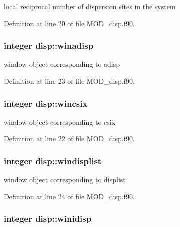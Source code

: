 local reciprocal number of dispersion sites in the system 



Definition at line 20 of file M\-O\-D\-\_\-disp.\-f90.

\hypertarget{classdisp_a496a52cc2d07a7b14d8febbd3975567b}{
\subsubsection[{winadisp}]{\setlength{\rightskip}{0pt plus 5cm}integer disp\-::winadisp}}\label{classdisp_a496a52cc2d07a7b14d8febbd3975567b}


window object corresponding to adisp 



Definition at line 23 of file M\-O\-D\-\_\-disp.\-f90.

\hypertarget{classdisp_aa37195cc4b48e320220322d2ce2cf5e5}{
\subsubsection[{wincsix}]{\setlength{\rightskip}{0pt plus 5cm}integer disp\-::wincsix}}\label{classdisp_aa37195cc4b48e320220322d2ce2cf5e5}


window object corresponding to csix 



Definition at line 22 of file M\-O\-D\-\_\-disp.\-f90.

\hypertarget{classdisp_a020abc5d4a3b714acb851b69b931668e}{
\subsubsection[{windisplist}]{\setlength{\rightskip}{0pt plus 5cm}integer disp\-::windisplist}}\label{classdisp_a020abc5d4a3b714acb851b69b931668e}


window object corresponding to displist 



Definition at line 24 of file M\-O\-D\-\_\-disp.\-f90.

\hypertarget{classdisp_a3645c6bd2911d105ae4dd5712b9b44dc}{
\subsubsection[{winidisp}]{\setlength{\rightskip}{0pt plus 5cm}integer disp\-::winidisp}}\label{classdisp_a3645c6bd2911d105ae4dd5712b9b44dc}


